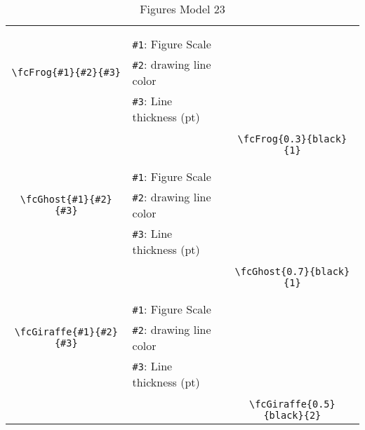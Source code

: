 \documentclass[x11names]{article}
\begin{document}
\begin{table}[H]
\begin{tabular}{|c|l|c|}
	&&\multirow{5}{*}{\fcFrog{0.3}{black}{1}}\\	&&\\	&\verb|#1|: Figure Scale &\\	\verb|\fcFrog{#1}{#2}{#3}|&	\verb|#2|: drawing line color &\\	&\verb|#3|: Line thickness (pt) &\\ &&\\&&	\verb|\fcFrog{0.3}{black}{1}|\\\hline 	
	&&\multirow{5}{*}{\fcGhost{0.7}{black}{1}}\\	&&\\	&\verb|#1|: Figure Scale &\\	\verb|\fcGhost{#1}{#2}{#3}|&	\verb|#2|: drawing line color &\\	&\verb|#3|: Line thickness (pt) &\\ &&\\&&	\verb|\fcGhost{0.7}{black}{1}|\\\hline 	
	&&\multirow{5}{*}{\fcGiraffe{0.5}{black}{2}}\\	&&\\	&\verb|#1|: Figure Scale &\\	\verb|\fcGiraffe{#1}{#2}{#3}|&	\verb|#2|: drawing line color &\\	&\verb|#3|: Line thickness (pt) &\\ &&\\&&	\verb|\fcGiraffe{0.5}{black}{2}|\\\hline 	\hline\end{tabular}\caption{Figures Model 23}\label{tab23}\end{table}
\end{document}
